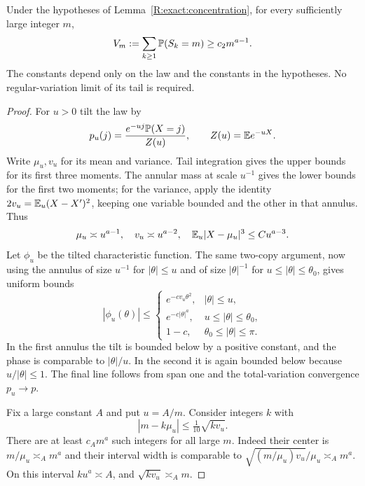 \begin{theorem}\label{R:exact:local}
Under the hypotheses of Lemma~\ref{R:exact:concentration}, for every sufficiently large integer $m$,
\[
 V_m:=\sum_{k\ge1}\mathbb P(S_k=m)\ge c_2m^{a-1}.
\]
The constants depend only on the law and the constants in the hypotheses. No regular-variation limit of its tail is required.
\end{theorem}
\begin{proof}
For $u>0$ tilt the law by
\[
 p_u(j)=\frac{e^{-uj}\mathbb P(X=j)}{Z(u)},\qquad Z(u)=\mathbb E e^{-uX}.
\]
Write $\mu_u,v_u$ for its mean and variance. Tail integration gives the upper bounds for its first three moments. The annular mass at scale $u^{-1}$ gives the lower bounds for the first two moments; for the variance, apply the identity $2v_u=\mathbb E_u(X-X')^2$, keeping one variable bounded and the other in that annulus. Thus
\[
 \mu_u\asymp u^{a-1},\quad v_u\asymp u^{a-2},\quad
 \mathbb E_u|X-\mu_u|^3\le Cu^{a-3}.
\]
Let $\phi_u$ be the tilted characteristic function. The same two-copy argument, now using the annulus of size $u^{-1}$ for $|\theta|\le u$ and of size $|\theta|^{-1}$ for $u\le|\theta|\le\theta_0$, gives uniform bounds
\begin{equation}\label{R:exact:fourier-bounds}
 |\phi_u(\theta)|\le
 \begin{cases}
 e^{-cv_u\theta^2},& |\theta|\le u,\\
 e^{-c|\theta|^a},& u\le|\theta|\le\theta_0,\\
 1-c,&\theta_0\le|\theta|\le\pi.
 \end{cases}
\end{equation}
In the first annulus the tilt is bounded below by a positive constant, and the phase is comparable to $|\theta|/u$. In the second it is again bounded below because $u/|\theta|\le1$. The final line follows from span one and the total-variation convergence $p_u\to p$.

Fix a large constant $A$ and put $u=A/m$. Consider integers $k$ with
\[
 |m-k\mu_u|\le\tfrac1{10}\sqrt{k v_u}.
\]
There are at least $c_A m^a$ such integers for all large $m$. Indeed their center is $m/\mu_u\asymp_A m^a$ and their interval width is comparable to $\sqrt{(m/\mu_u)v_u}/\mu_u\asymp_A m^a$. On this interval $ku^a\asymp A$, and $\sqrt{kv_u}\asymp_A m$.


\end{proof}
